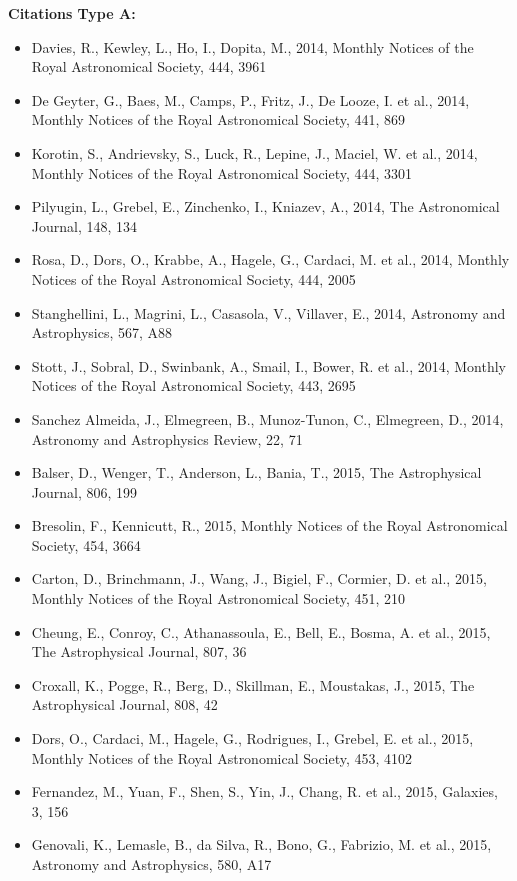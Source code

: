 \documentclass{letter}
\begin{document}
\begin{enumerate}
{\bf Citations Type A:}
\begin{itemize}
\item Davies, R., Kewley, L., Ho, I., Dopita, M., 2014, Monthly Notices of the Royal Astronomical Society, 444, 3961
\item De Geyter, G., Baes, M., Camps, P., Fritz, J., De Looze, I. et al., 2014, Monthly Notices of the Royal Astronomical Society, 441, 869
\item Korotin, S., Andrievsky, S., Luck, R., Lepine, J., Maciel, W. et al., 2014, Monthly Notices of the Royal Astronomical Society, 444, 3301
\item Pilyugin, L., Grebel, E., Zinchenko, I., Kniazev, A., 2014, The Astronomical Journal, 148, 134
\item Rosa, D., Dors, O., Krabbe, A., Hagele, G., Cardaci, M. et al., 2014, Monthly Notices of the Royal Astronomical Society, 444, 2005
\item Stanghellini, L., Magrini, L., Casasola, V., Villaver, E., 2014, Astronomy and Astrophysics, 567, A88
\item Stott, J., Sobral, D., Swinbank, A., Smail, I., Bower, R. et al., 2014, Monthly Notices of the Royal Astronomical Society, 443, 2695
\item Sanchez Almeida, J., Elmegreen, B., Munoz-Tunon, C., Elmegreen, D., 2014, Astronomy and Astrophysics Review, 22, 71
\item Balser, D., Wenger, T., Anderson, L., Bania, T., 2015, The Astrophysical Journal, 806, 199
\item Bresolin, F., Kennicutt, R., 2015, Monthly Notices of the Royal Astronomical Society, 454, 3664
\item Carton, D., Brinchmann, J., Wang, J., Bigiel, F., Cormier, D. et al., 2015, Monthly Notices of the Royal Astronomical Society, 451, 210
\item Cheung, E., Conroy, C., Athanassoula, E., Bell, E., Bosma, A. et al., 2015, The Astrophysical Journal, 807, 36
\item Croxall, K., Pogge, R., Berg, D., Skillman, E., Moustakas, J., 2015, The Astrophysical Journal, 808, 42
\item Dors, O., Cardaci, M., Hagele, G., Rodrigues, I., Grebel, E. et al., 2015, Monthly Notices of the Royal Astronomical Society, 453, 4102
\item Fernandez, M., Yuan, F., Shen, S., Yin, J., Chang, R. et al., 2015, Galaxies, 3, 156
\item Genovali, K., Lemasle, B., da Silva, R., Bono, G., Fabrizio, M. et al., 2015, Astronomy and Astrophysics, 580, A17

\end{itemize}
\end{enumerate}
\end{document}
